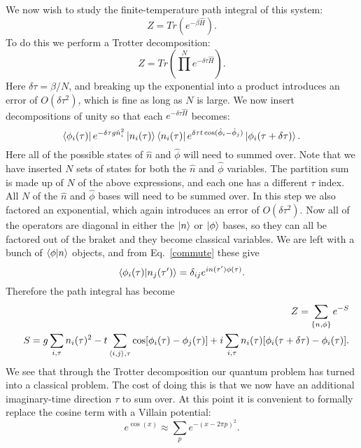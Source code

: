 We now wish to study the finite-temperature path integral of this system:
\begin{equation}
Z=Tr(e^{-\beta \hat H}).
\end{equation}
To do this we perform a Trotter decomposition:
\begin{equation}
Z=Tr(\prod^N e^{-\delta\tau \hat H}).
\end{equation}
Here $\delta\tau=\beta/N$, and breaking up the exponential into a product introduces an error of $O(\delta\tau^2)$, which is fine as long as $N$ is large. We now insert decompositions of unity so that each $e^{-\delta\tau\hat H}$ becomes:
\begin{equation}
\bra{\phi_i(\tau)} e^{-\delta\tau g \hat n_i^2} \ket{n_i(\tau)} \bra{n_i(\tau)} e^{\delta\tau t\cos(\hat\phi_i-\hat\phi_j)} \ket{\phi_i(\tau+\delta\tau)}.
\end{equation}
Here all of the possible states of $\hat n$ and $\hat\phi$ will need to summed over. Note that we have inserted $N$ sets of states for both the $\hat n$ and $\hat\phi$ variables. 
The partition sum is made up of $N$ of the above expressions, and each one has a different $\tau$ index. All $N$ of the $\hat n$ and $\hat \phi$ bases will need to be summed over.
In this step we also factored an exponential, which again introduces an error of $O(\delta\tau^2)$. Now all of the operators are diagonal in either the $\ket{n}$ or $\ket{\phi}$ bases, so they can all be factored out of the braket and they become classical variables. We are left with a bunch of $\braket{\phi|n}$ objects, and from Eq.~\ref{commute} these give
\begin{equation}
\braket{\phi_i(\tau)|n_j(\tau^\prime)}=\delta_{ij}e^{i n(\tau^\prime)\phi(\tau)}.
\end{equation}
Therefore the path integral has become
\begin{eqnarray}
&&Z=\sum_{\{n,\phi\}}e^{-S}\nonumber\\
&&S=g\sum_{i,\tau} n_i(\tau)^2-t\sum_{\langle i,j\rangle,\tau} \cos[ \phi_i(\tau)-\phi_j(\tau)]+i\sum_{i,\tau} n_i(\tau)[\phi_i(\tau+\delta\tau)-\phi_i(\tau)].
\label{first_classical}
\end{eqnarray}
We see that through the Trotter decomposition our quantum problem has turned into a classical problem. The cost of doing this is that we now have an additional imaginary-time direction $\tau$ to sum over. At this point it is convenient to formally replace the cosine term with a Villain potential:
\begin{equation}
e^{\cos(x)}\approx\sum_p e^{-(x-2\pi p)^2}.
\label{Villain}
\end{equation}
